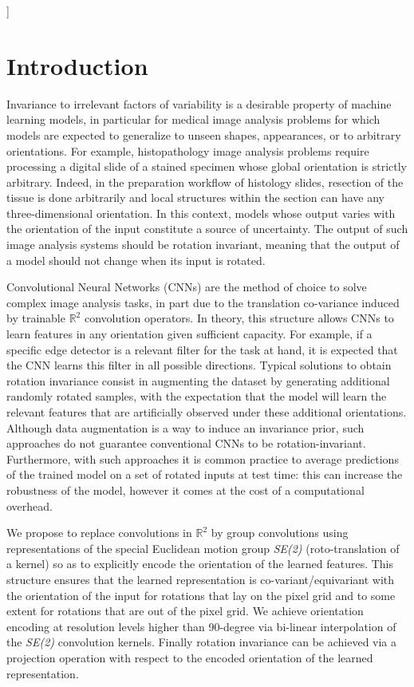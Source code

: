 \documentclass[twocolumn,final]{article}
\newcommand{\se}[1]{\textit{SE(#1)}}
\newcommand{\mset}[2]{$\mathbb{#1}^{#2}$}
\begin{document}
]


\section{Introduction}
\label{introduction}
Invariance to irrelevant factors of variability is a desirable property of machine learning models, in particular for medical image analysis problems for which models are expected to generalize to unseen shapes, appearances, or to arbitrary orientations.
For example, histopathology image analysis problems require processing a digital slide of a stained specimen whose global orientation is strictly arbitrary.
Indeed, in the preparation workflow of histology slides, resection of the tissue is done arbitrarily and local structures within the section can have any three-dimensional orientation.
In this context, models whose output varies with the orientation of the input constitute a source of uncertainty.
The output of such image analysis systems should be rotation invariant, meaning that the output of a model should not change when its input is rotated.


Convolutional Neural Networks (CNNs) are the method of choice to solve complex image analysis tasks, in part due to the translation co-variance induced by trainable \mset{R}{2} convolution operators.
In theory, this structure allows CNNs to learn features in any orientation given sufficient capacity.
For example, if a specific edge detector is a relevant filter for the task at hand, it is expected that the CNN learns this filter in all possible directions.
Typical solutions to obtain rotation invariance consist in augmenting the dataset by generating additional randomly rotated samples, with the expectation that the model will learn the relevant features that are artificially observed under these additional orientations.
Although data augmentation is a way to induce an invariance prior, such approaches do not guarantee conventional CNNs to be rotation-invariant.
Furthermore, with such approaches it is common practice to average predictions of the trained model on a set of rotated inputs at test time: this can increase the robustness of the model, however it comes at the cost of a computational overhead.

We propose to replace convolutions in \mset{R}{2} by group convolutions using representations of the special Euclidean motion group \se{2} (roto-translation of a kernel) so as to explicitly encode the orientation of the learned features.
This structure ensures that the learned representation is co-variant/equivariant with the orientation of the input for rotations that lay on the pixel grid and to some extent for rotations that are out of the pixel grid.
We achieve orientation encoding at resolution levels higher than 90-degree via bi-linear interpolation of the \se{2} convolution kernels.
Finally rotation invariance can be achieved via a projection operation with respect to the encoded orientation of the learned representation.
\end{document}
